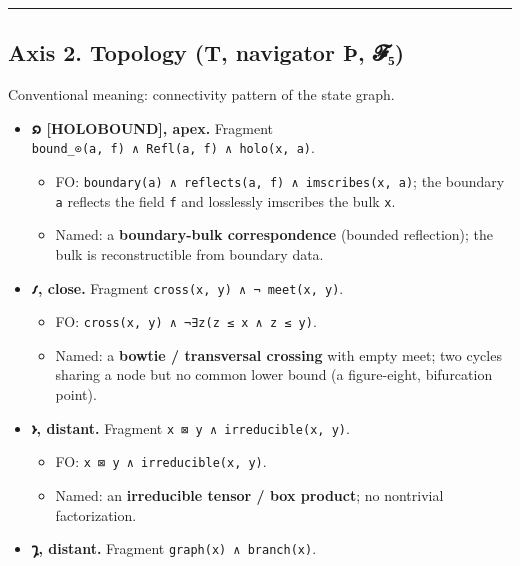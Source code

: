 \begin{center}\rule{0.5\linewidth}{0.5pt}\end{center}

\hypertarget{axis-2.-topology-t-navigator-uxfe-ux1d4d5ux2085}{%
\subsection{Axis 2. Topology (T, navigator Þ,
𝓕₅)}\label{axis-2.-topology-t-navigator-uxfe-ux1d4d5ux2085}}

Conventional meaning: connectivity pattern of the state graph.

\begin{itemize}
\tightlist
\item
  \textbf{𐑸 {[}HOLOBOUND{]}, apex.} Fragment
  \texttt{bound\_⊙(a,\ f)\ ∧\ Refl(a,\ f)\ ∧\ holo(x,\ a)}.

  \begin{itemize}
  \tightlist
  \item
    FO: \texttt{boundary(a)\ ∧\ reflects(a,\ f)\ ∧\ imscribes(x,\ a)};
    the boundary \texttt{a} reflects the field \texttt{f} and losslessly
    imscribes the bulk \texttt{x}.
  \item
    Named: a \textbf{boundary-bulk correspondence} (bounded reflection);
    the bulk is reconstructible from boundary data.
  \end{itemize}
\item
  \textbf{𐑥, close.} Fragment \texttt{cross(x,\ y)\ ∧\ ¬\ meet(x,\ y)}.

  \begin{itemize}
  \tightlist
  \item
    FO: \texttt{cross(x,\ y)\ ∧\ ¬∃z(z\ ≤\ x\ ∧\ z\ ≤\ y)}.
  \item
    Named: a \textbf{bowtie / transversal crossing} with empty meet; two
    cycles sharing a node but no common lower bound (a figure-eight,
    bifurcation point).
  \end{itemize}
\item
  \textbf{𐑶, distant.} Fragment \texttt{x\ ⊠\ y\ ∧\ irreducible(x,\ y)}.

  \begin{itemize}
  \tightlist
  \item
    FO: \texttt{x\ ⊠\ y\ ∧\ irreducible(x,\ y)}.
  \item
    Named: an \textbf{irreducible tensor / box product}; no nontrivial
    factorization.
  \end{itemize}
\item
  \textbf{𐑡, distant.} Fragment \texttt{graph(x)\ ∧\ branch(x)}.


\end{itemize}
